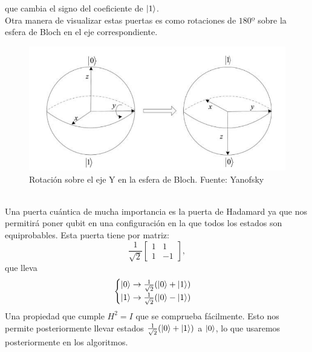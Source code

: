 \documentclass[a4paper]{article}
\numberwithin{equation}{section}
\begin{document}
que cambia el signo del coeficiente de $\ket{1}$.\\
Otra manera de visualizar estas puertas es como rotaciones de $180º$ sobre la esfera de Bloch en el eje correspondiente. \\
\begin{figure}[h]
	\centering
	\includegraphics[scale=.65]{rotacion_bloch}
	\caption{Rotación sobre el eje Y en la esfera de Bloch. Fuente: Yanofsky \cite{yanofsky2008quantum}}
\end{figure}\\
Una puerta cuántica de mucha importancia es la puerta de Hadamard ya que nos permitirá poner qubit en una configuración en la que todos los estados son equiprobables. Esta puerta tiene por matriz:
\begin{equation}
\frac{1}{\sqrt{2}}
\begin{bmatrix}
1 & 1 \\
1 & -1
\end{bmatrix},
\end{equation}
que lleva
\begin{equation}
\begin{cases}
\ket{0} \rightarrow \frac{1}{\sqrt{2}}(\ket{0} + \ket{1}) \\
\ket{1} \rightarrow \frac{1}{\sqrt{2}}(\ket{0} - \ket{1})
\end{cases}
\end{equation}
Una propiedad que cumple $H^2 = I$ que se comprueba fácilmente. Esto nos permite posteriormente llevar estados $\frac{1}{\sqrt{2}}(\ket{0} + \ket{1})$ a $\ket{0}$, lo que usaremos posteriormente en los algoritmos.
\end{document}
